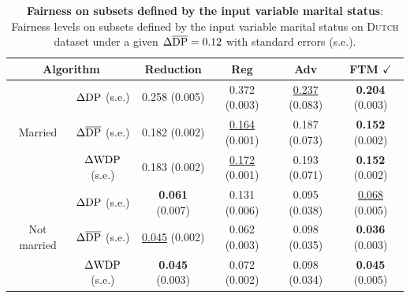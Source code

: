 \documentclass[10pt]{article} %
\begin{document}
\begin{table}[h]
    \scriptsize
    \centering
    \caption{
    \textbf{Fairness on subsets defined by the input variable marital status}:
    Fairness levels on subsets defined by the input variable marital status on \textsc{Dutch} dataset under a given $\Delta \overline{\textup{DP}} = 0.12$ with standard errors (s.e.).
    }
    \label{table:subgroup-2-append}
    \vskip 0.1in
    \begin{tabular}{c|c||c|c|c|c}
        \toprule
        \multicolumn{2}{c||}{Algorithm} & Reduction & Reg & Adv & FTM $\checkmark$
        \\
        \midrule
        \midrule
        \multirow{3}{*}{Married} & $\Delta \textup{DP}$ (s.e.) & 0.258 (0.005) & 0.372 (0.003) & \underline{0.237} (0.083) & \textbf{0.204} (0.003)
        \\
        & $\Delta \overline{\textup{DP}}$ (s.e.) & 0.182 (0.002) & \underline{0.164} (0.001) & 0.187 (0.073) & \textbf{0.152} (0.002)
        \\
        & $\Delta \textup{WDP}$ (s.e.) & 0.183 (0.002) & \underline{0.172} (0.001) & 0.193 (0.071) & \textbf{0.152} (0.002)
        \\
        \midrule
        \multirow{3}{*}{Not married} & $\Delta \textup{DP}$ (s.e.) & \textbf{0.061} (0.007) & 0.131 (0.006) & 0.095 (0.038) & \underline{0.068} (0.005)
        \\
        & $\Delta \overline{\textup{DP}}$ (s.e.) & \underline{0.045} (0.002) & 0.062 (0.003) & 0.098 (0.035) & \textbf{0.036} (0.003)
        \\
        & $\Delta \textup{WDP}$ (s.e.) & \textbf{0.045} (0.003) & 0.072 (0.002) & 0.098 (0.034) & \textbf{0.045} (0.005)
        \\
        \bottomrule
    \end{tabular}
\end{table}


\end{document}

